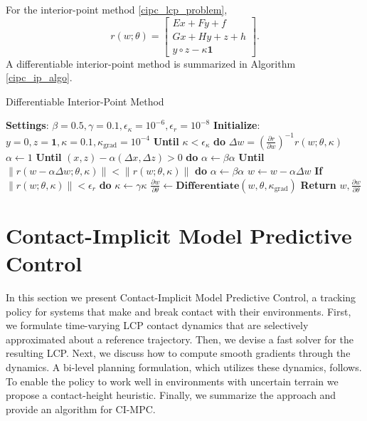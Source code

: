 For the interior-point method \eqref{cipc_lcp_problem}, 
\begin{equation}
	r(w; \theta) = \begin{bmatrix} E x + F y + f \\ G x + H y + z + h \\ y \circ z - \kappa \textbf{1}\end{bmatrix}.
\end{equation}
A differentiable interior-point method is summarized in Algorithm \ref{cipc_ip_algo}.

\begin{algorithm}[H]
	\caption{Differentiable Interior-Point Method}\label{cipc_ip_algo}
	\begin{algorithmic}[1]
		\State \textbf{Settings}: $\beta = 0.5, \gamma = 0.1, \epsilon_{\kappa} = 10^{-6}, \epsilon_{r} = 10^{-8}$
		\State \textbf{Initialize}: $y = 0, z = \mathbf{1}, \kappa = 0.1, \kappa_{\mbox{grad}} = 10^{-4}$
		\State \textbf{Until} $\kappa < \epsilon_{\kappa}$ \textbf{do} 
		\State \indent $\Delta w = (\frac{\partial r}{\partial w})^{-1} r(w; \theta, \kappa)$
		\State \indent $\alpha \leftarrow 1$
		\State \indent \textbf{Until} $(x, z) - \alpha (\Delta x, \Delta z) > 0$ \textbf{do} $\alpha \leftarrow \beta \alpha$
		\State \indent \textbf{Until} $\|r(w-\alpha\Delta w; \theta, \kappa)\| < \|r(w; \theta, \kappa)\|$ \textbf{do}
		\State \indent \indent $\alpha \leftarrow \beta \alpha$
		\State \indent $w \leftarrow w - \alpha \Delta w$
		\State \indent \textbf{If} $\|r(w; \theta, \kappa)\| < \epsilon_{r}$ \textbf{do} $\kappa \leftarrow \gamma \kappa$
		\State $\frac{\partial w}{\partial \theta} \leftarrow \textbf{Differentiate}(w, \theta, \kappa_{\mbox{grad}})$ 
		\State \textbf{Return} $w, \frac{\partial w}{\partial \theta}$ 
		\EndProcedure
	\end{algorithmic}
\end{algorithm}

\section{Contact-Implicit Model Predictive  Control} \label{cimpc}
In this section we present Contact-Implicit Model Predictive  Control, a tracking policy for systems that make and break contact with their environments. First, we formulate time-varying LCP contact dynamics that are selectively approximated about a reference trajectory. Then, we devise a fast solver for the resulting LCP. Next, we discuss how to compute smooth gradients through the dynamics. A bi-level planning formulation, which utilizes these dynamics, follows. To enable the policy to work well in environments with uncertain terrain we propose a contact-height heuristic. Finally, we summarize the approach and provide an algorithm for CI-MPC.

